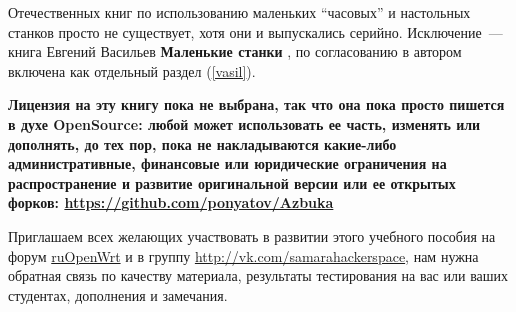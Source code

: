 Отечественных книг по использованию маленьких ``часовых'' и настольных станков
просто не существует, хотя они и выпускались серийно. Исключение\ --- книга
Евгений Васильев \textbf{Маленькие станки} \cite{vasil}, по согласованию в
автором включена как отдельный раздел (\ref{vasil}).

\bigskip
\textbf{Лицензия на эту книгу пока не выбрана, так что она пока просто пишется в
духе OpenSource: любой может использовать ее часть, изменять или дополнять, до
тех пор, пока не накладываются какие-либо административные, финансовые или
юридические ограничения на распространение и развитие оригинальной версии или ее
открытых форков: \url{https://github.com/ponyatov/Azbuka}}
\bigskip

Приглашаем всех желающих участвовать в развитии этого учебного пособия на форум
\href{https://groups.google.com/forum/\#!forum/openwrt2ru}{ruOpenWrt} и в группу
\url{http://vk.com/samarahackerspace}, нам нужна обратная связь по качеству
материала, результаты тестирования на вас или ваших студентах, дополнения и
замечания.
